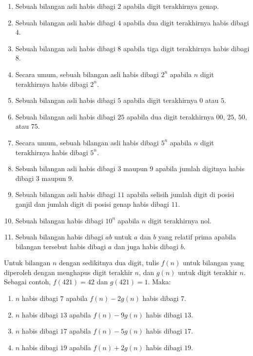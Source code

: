 \documentclass[12pt]{scrartcl}
\begin{document}
\begin{enumerate}
    \item Sebuah bilangan asli habis dibagi $2$ apabila digit terakhirnya genap.
    \item Sebuah bilangan asli habis dibagi $4$ apabila dua digit terakhirnya habis dibagi $4$.
    \item Sebuah bilangan asli habis dibagi $8$ apabila tiga digit terakhirnya habis dibagi $8$.
    \item Secara umum, sebuah bilangan asli habis dibagi $2^n$ apabila
    $n$ digit terakhirnya habis dibagi $2^n$.
    \item Sebuah bilangan asli habis dibagi $5$ apabila digit terakhirnya $0$ atau $5$.
    \item Sebuah bilangan asli habis dibagi $25$ apabila dua digit terakhirnya
    $00$, $25$, $50$, atau $75$.
    \item Secara umum, sebuah bilangan asli habis dibagi $5^n$ apabila
    $n$ digit terakhirnya habis dibagi $5^n$.
    \item Sebuah bilangan asli habis dibagi $3$ maupun $9$ apabila jumlah digitnya
    habis dibagi $3$ maupun $9$.
    \item Sebuah bilangan asli habis dibagi $11$ apabila selisih jumlah digit
    di posisi ganjil dan jumlah digit di posisi genap habis dibagi $11$.
    \item Sebuah bilangan habis dibagi $10^n$ apabila $n$ digit terakhirnya nol.
    \item Sebuah bilangan habis dibagi $ab$ untuk $a$ dan $b$ yang relatif prima
    apabila bilangan tersebut habis dibagi $a$ dan juga habis dibagi $b$.
\end{enumerate}

Untuk bilangan $n$ dengan sedikitnya dua digit, tulis $f(n)$ untuk bilangan yang
diperoleh dengan menghapus digit terakhir $n$, dan $g(n)$ untuk digit terakhir $n$.
Sebagai contoh, $f(421) = 42$ dan $g(421) = 1$. Maka:
\begin{enumerate}
    \item $n$ habis dibagi $7$ apabila $f(n) - 2g(n)$ habis dibagi $7$.
    \item $n$ habis dibagi $13$ apabila $f(n) - 9g(n)$ habis dibagi $13$.
    \item $n$ habis dibagi $17$ apabila $f(n) - 5g(n)$ habis dibagi $17$.
    \item $n$ habis dibagi $19$ apabila $f(n) + 2g(n)$ habis dibagi $19$.
\end{enumerate}
\end{document}
